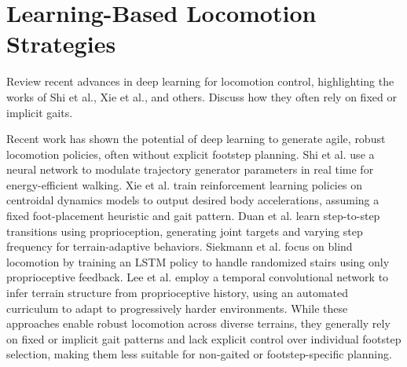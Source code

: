\section{Learning-Based Locomotion Strategies}

\begin{outline}
  Review recent advances in deep learning for locomotion control,
  highlighting the works of Shi et al., Xie et al., and others.
  Discuss how they often rely on fixed or implicit gaits.
\end{outline}

Recent work has shown the potential of deep learning to generate
agile, robust locomotion policies, often without explicit footstep
planning. Shi et al. \cite{shi_terrain-aware_2023} use a neural
network to modulate trajectory generator parameters in real time for
energy-efficient walking. Xie et al. \cite{xie_glide_2023} train
reinforcement learning policies on centroidal dynamics models to
output desired body accelerations, assuming a fixed foot-placement
heuristic and gait pattern. Duan et al. \cite{duan_sim--real_2022}
learn step-to-step transitions using proprioception, generating joint
targets and varying step frequency for terrain-adaptive behaviors.
Siekmann et al. \cite{siekmann_blind_2021} focus on blind locomotion
by training an LSTM policy to handle randomized stairs using only
proprioceptive feedback. Lee et al. \cite{lee_learning_2020} employ a
temporal convolutional network to infer terrain structure from
proprioceptive history, using an automated curriculum to adapt to
progressively harder environments. While these approaches enable
robust locomotion across diverse terrains, they generally rely on
fixed or implicit gait patterns and lack explicit control over
individual footstep selection, making them less suitable for
non-gaited or footstep-specific planning.
